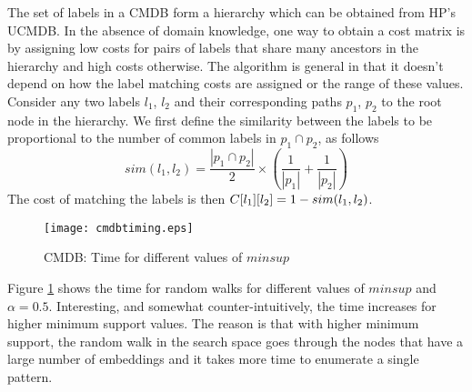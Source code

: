 \smallskip{} 
The set of labels in a CMDB form a
hierarchy which can be obtained from HP's UCMDB. In the absence of
domain knowledge, one way to obtain a cost matrix is by assigning low
costs for pairs of labels that share many ancestors in the hierarchy and
high costs otherwise. The algorithm is general in that it doesn't depend
on how the label matching costs are assigned or the range of these
values.  Consider any two labels $l_1$, $l_2$ and their corresponding
paths $p_1$, $p_2$ to the root node in the hierarchy.  We first define
the similarity between the labels to be proportional to the number of
common labels in $p_1 \cap p_2$, as follows
\begin{equation*}
  sim(l_1,l_2) =  \frac{|p_1 \cap p_2|}{2} \times 
  \left(\frac{1}{|p_1|} + \frac{1}{|p_2|}\right)
\end{equation*}
The cost of matching the labels is then 
${C}[l_1][l_2] = 1 - sim(l_1,l_2)$.

\begin{figure}[!ht]
  \centerline{
    \texttt{[image: cmdbtiming.eps]}
	}
    \caption{CMDB: Time for different values of
	$minsup$}
    \label{fig:ge}
\end{figure}


\smallskip{} Figure \ref{fig:ge} shows the
time for random walks for different values of $minsup$ and $\alpha =
0.5$. Interesting, and somewhat counter-intuitively, the time increases
for higher minimum support values.  The reason is that with higher
minimum support, the random walk in the search space goes through the
nodes that have a large number of embeddings and it takes more time to
enumerate a single pattern.

